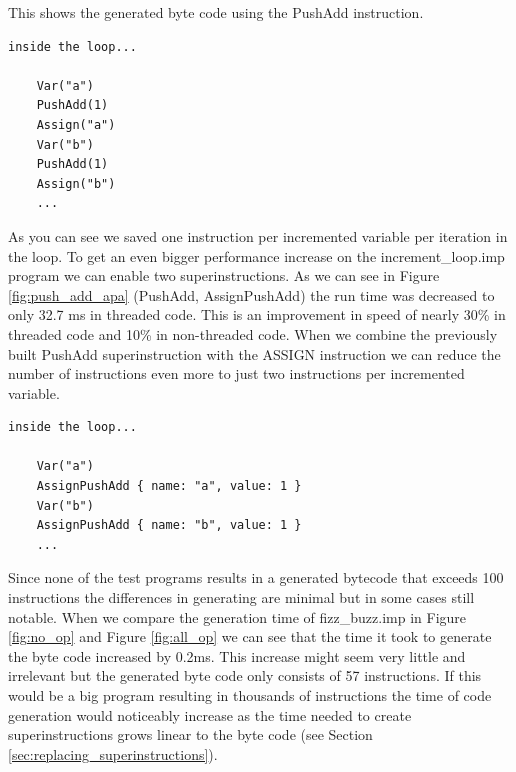 \documentclass{article}
\begin{document}
This shows the generated byte code using the PushAdd instruction.
\begin{verbatim}
inside the loop...

    Var("a")
    PushAdd(1)
    Assign("a")
    Var("b")
    PushAdd(1)
    Assign("b")
    ...
\end{verbatim}

As you can see we saved one instruction per incremented variable per
iteration in the loop. 
To get an even bigger performance increase on the increment\_loop.imp program
we can enable two superinstructions. As we can see in Figure
\ref{fig:push_add_apa} (PushAdd, AssignPushAdd) the run time was decreased to
only 32.7 ms in threaded code. This is an improvement in speed of nearly 30\%
in threaded code and 10\% in non-threaded code.
When we combine the previously built PushAdd superinstruction with the ASSIGN
instruction we can reduce the number of instructions even more to just two
instructions per incremented variable.

\begin{verbatim}
inside the loop...

    Var("a")
    AssignPushAdd { name: "a", value: 1 }
    Var("b")
    AssignPushAdd { name: "b", value: 1 }
    ...
\end{verbatim}

Since none of the test programs results in a generated bytecode that exceeds
100 instructions the differences in generating are minimal but in some cases
still notable. When we compare the generation time of fizz\_buzz.imp in Figure
\ref{fig:no_op} and Figure \ref{fig:all_op} we can see that the time it took to
generate the byte code increased by 0.2ms. This increase might seem very little
and irrelevant but the generated byte code only consists of 57 instructions. If
this would be a big program resulting in thousands of instructions the time of
code generation would noticeably increase as the time needed to create
superinstructions grows linear to the byte code (see Section
\ref{sec:replacing_superinstructions}).
\end{document}
